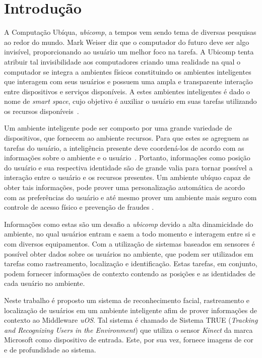 \chapter{Introdução}
	
A Computação Ubíqua, \textit{ubicomp}, a tempos vem sendo tema de diversas
pesquisas ao redor do mundo. Mark Weiser diz que o computador do futuro deve ser
algo invisível, proporcionando ao usuário um melhor foco na tarefa. A Ubicomp
tenta atribuir tal invisibilidade aos computadores criando uma realidade na qual
o computador se integra a ambientes físicos constituindo os ambientes
inteligentes que interagem com seus usuários e possuem uma ampla e transparente
interação entre dispositivos e serviços disponíveis. A estes ambientes
inteligentes é dado o nome de \textit{smart space}, cujo objetivo é auxiliar o
usuário em suas tarefas utilizando os recursos
disponíveis~\cite{fabriciobuzzeto,alegomes,weiser1, weiser2}.
	
Um ambiente inteligente pode ser composto por uma grande variedade de
dispositivos, que fornecem ao ambiente recursos. Para que estes se agreguem as
tarefas do usuário, a inteligência presente deve coordená-los de acordo com as
informações sobre o ambiente e o usuário~\cite{fabriciobuzzeto}. Portanto,
informações como posição do usuário e sua respectiva identidade são de grande
valia para tornar possível a interação entre o usuário e os recursos presentes.
Um ambiente ubíquo capaz de obter tais informações, pode prover uma
personalização automática de acordo com as preferências do usuário e até mesmo
prover um ambiente mais seguro com controle de acesso físico e prevenção de
fraudes \cite{saocarlos}.
	
Informações como estas são um desafio a \textit{ubicomp} devido a alta
dinamicidade do ambiente, no qual usuários entram e saem a todo momento e interagem entre si e
com diversos equipamentos. Com a utilização de sistemas baseados em sensores é
possível obter dados sobre os usuários no ambiente, que podem ser utilizados em
tarefas como rastreamento, localização e identificação. Estas tarefas, em
conjunto, podem fornecer informações de contexto contendo as posições e as
identidades de cada usuário no ambiente.
	
Neste trabalho é proposto um sistema de reconhecimento facial, rastreamento e
localização de usuários em um ambiente inteligente afim de prover informações de
contexto ao Middleware \textit{uOS}. Tal sistema é chamado de Sistema TRUE
(\textit{Tracking and Recognizing Users in the Environment}) que utiliza o
sensor \textit{Kinect} da marca Microsoft como dispositivo de entrada. Este, por
sua vez, fornece imagens de cor e de profundidade ao sistema.
	
